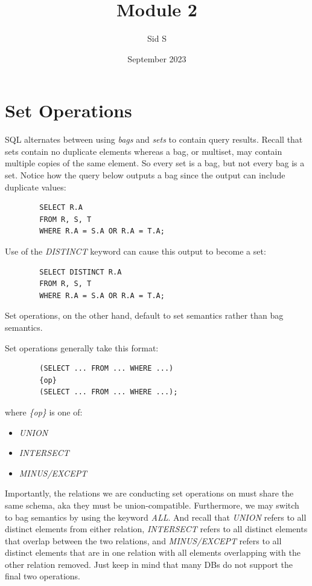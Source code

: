 \documentclass{article}
\title{Module 2}
\author{Sid S}
\date{September 2023}
\begin{document}
\section*{Set Operations}
SQL alternates between using \textit{bags} and \textit{sets} to contain query results. Recall that sets contain no duplicate elements whereas a bag, or multiset, may contain multiple copies of the same element. So every set is a bag, but not every bag is a set. Notice how the query below outputs a bag since the output can include duplicate values:

\begin{tcolorbox}
    \begin{verbatim}
        SELECT R.A
        FROM R, S, T
        WHERE R.A = S.A OR R.A = T.A;
    \end{verbatim}
\end{tcolorbox}

Use of the \textit{DISTINCT} keyword can cause this output to become a set:

\begin{tcolorbox}
    \begin{verbatim}
        SELECT DISTINCT R.A
        FROM R, S, T
        WHERE R.A = S.A OR R.A = T.A;
    \end{verbatim}
\end{tcolorbox}

Set operations, on the other hand, default to set semantics rather than bag semantics. 

Set operations generally take this format:

\begin{tcolorbox}
    \begin{verbatim}
        (SELECT ... FROM ... WHERE ...)
        {op}
        (SELECT ... FROM ... WHERE ...);
    \end{verbatim}
    where \textit{\{op\}} is one of:
    \begin{itemize}
        \item \textit{UNION}
        \item \textit{INTERSECT}
        \item \textit{MINUS/EXCEPT}
    \end{itemize}
\end{tcolorbox}

Importantly, the relations we are conducting set operations on must share the same schema, aka they must be union-compatible. Furthermore, we may switch to bag semantics by using the keyword \textit{ALL}. And recall that \textit{UNION} refers to all distinct elements from either relation, \textit{INTERSECT} refers to all distinct elements that overlap between the two relations, and \textit{MINUS/EXCEPT} refers to all distinct elements that are in one relation with all elements overlapping with the other relation removed. Just keep in mind that many DBs do not support the final two operations.
\end{document}
